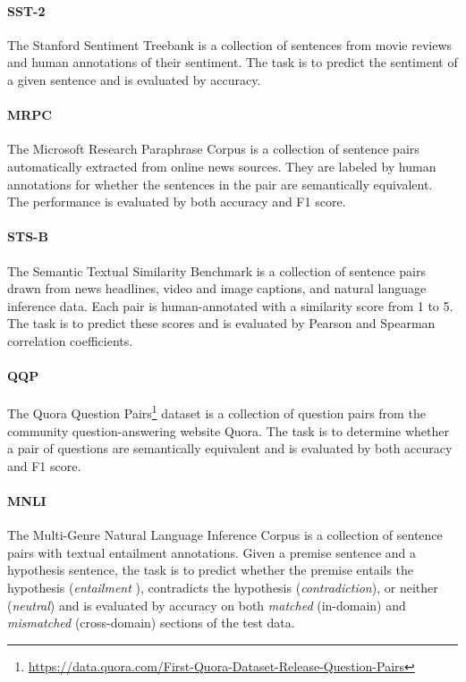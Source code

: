 \documentclass[11pt,a4paper]{article}
\begin{document}
\paragraph{SST-2} The Stanford Sentiment Treebank \citep{socher2013recursive} is a collection of sentences from movie reviews and human annotations of their sentiment. The task is to predict the sentiment of a given sentence and is evaluated by accuracy.

\paragraph{MRPC} The Microsoft Research Paraphrase Corpus \citep{dolan2005automatically} is a collection of sentence pairs automatically extracted from online news sources. They are labeled by human annotations for whether the sentences in the pair are semantically equivalent. The performance is evaluated by both accuracy and F1 score.

\paragraph{STS-B} The Semantic Textual Similarity Benchmark \citep{cer2017semeval} is a collection of sentence pairs drawn from news headlines, video and image captions, and natural language inference data. Each pair is human-annotated with a similarity score from 1 to 5. The task is to predict these scores and is evaluated by Pearson and Spearman correlation coefficients.

\paragraph{QQP} The Quora Question Pairs\footnote{\url{https://data.quora.com/First-Quora-Dataset-Release-Question-Pairs}} \citep{chen2018quora} dataset is a collection of question pairs from the community question-answering website Quora. The task is to determine whether a pair of questions are semantically equivalent and is evaluated by both accuracy and F1 score.

\paragraph{MNLI} The Multi-Genre Natural Language Inference Corpus \citep{williams2018broad} is a collection of sentence pairs with textual entailment annotations. Given a premise sentence and a hypothesis sentence, the task is to predict whether the premise entails the hypothesis (\emph{entailment
}), contradicts the hypothesis (\emph{contradiction}), or neither (\emph{neutral}) and is evaluated by accuracy on both \emph{matched} (in-domain) and \emph{mismatched} (cross-domain) sections of the test data.
\end{document}
